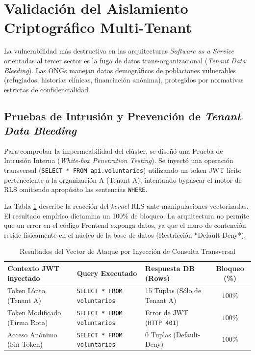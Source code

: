 \section{Validaci\'on del Aislamiento Criptogr\'afico Multi-Tenant}

La vulnerabilidad m\'as destructiva en las arquitecturas \textit{Software as a Service} orientadas al tercer sector es la fuga de datos trans-organizacional (\textit{Tenant Data Bleeding}). Las ONGs manejan datos demogr\'aficos de poblaciones vulnerables (refugiados, historias cl\'inicas, financiaci\'on an\'onima), protegidos por normativas estrictas de confidencialidad.

\subsection{Pruebas de Intrusi\'on y Prevenci\'on de \textit{Tenant Data Bleeding}}
Para comprobar la impermeabilidad del cl\'uster, se dise\~n\'o una Prueba de Intrusi\'on Interna (\textit{White-box Penetration Testing}). Se inyect\'o una operaci\'on transversal (\texttt{SELECT * FROM api.voluntarios}) utilizando un token JWT l\'icito perteneciente a la organizaci\'on A (Tenant A), intentando bypasear el motor de RLS omitiendo aprop\'osito las sentencias \texttt{WHERE}.

La Tabla \ref{tab:intrusion_rls} describe la reacci\'on del \textit{kernel} RLS ante manipulaciones vectorizadas. El resultado emp\'irico dictamina un 100\% de bloqueo. La arquitectura no permite que un error en el c\'odigo Frontend exponga datos, ya que el muro de contenci\'on reside f\'isicamente en el n\'ucleo de la base de datos (Restricci\'on *Default-Deny*).

\begin{table}[htpb]
\centering
\caption{Resultados del Vector de Ataque por Inyecci\'on de Consulta Transversal}
\label{tab:intrusion_rls}
\vspace{2mm}
\begin{tabular}{@{}lllc@{}}
\toprule
\textbf{Contexto JWT inyectado} & \textbf{Query Executado} & \textbf{Respuesta DB (Rows)} & \textbf{Bloqueo (\%)} \\
\midrule
Token L\'icito (Tenant A) & \texttt{SELECT * FROM voluntarios} & 15 Tuplas (S\'olo de Tenant A) & $100 \%$ \\
Token Modificado (Firma Rota) & \texttt{SELECT * FROM voluntarios} & Error de JWT (\texttt{HTTP 401}) & $100 \%$ \\
Acceso An\'onimo (Sin Token) & \texttt{SELECT * FROM voluntarios} & 0 Tuplas (Default-Deny) & $100 \%$ \\
\bottomrule
\end{tabular}
\end{table}

